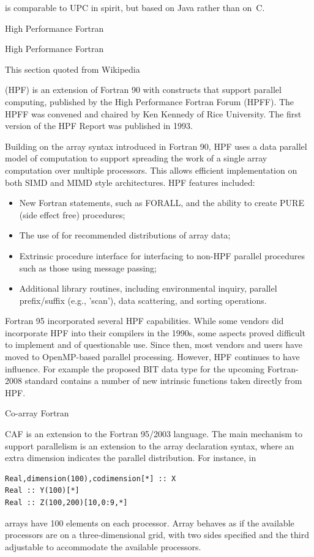 
 is comparable to \ac{UPC} in spirit, but based on Java rather
than on~C.

 {High Performance Fortran}
\label{sec:HPF}

High Performance Fortran
\begin{footnoteenv}
  {This section quoted from Wikipedia}
\end{footnoteenv}
(HPF) is an extension of Fortran 90 with constructs that support
parallel computing, published by the High Performance Fortran Forum
(HPFF). The HPFF was convened and chaired by Ken Kennedy of Rice
University. The first version of the HPF Report was published in 1993.

Building on the array syntax introduced in Fortran 90, HPF uses a data
parallel model of computation to support spreading the work of a
single array computation over multiple processors. This allows
efficient implementation on both SIMD and MIMD style
architectures. HPF features included:
\begin{itemize}
\item New Fortran statements, such as FORALL, and the ability to
  create PURE (side effect free) procedures;
\item The use of  for recommended
  distributions of array data;
\item Extrinsic procedure interface for interfacing to non-HPF
  parallel procedures such as those using message passing;
\item Additional library routines, including environmental inquiry,
  parallel prefix/suffix (e.g., 'scan'), data scattering, and sorting
  operations.
\end{itemize}
Fortran 95 incorporated several HPF capabilities.  While some vendors
did incorporate HPF into their compilers in the 1990s, some aspects
proved difficult to implement and of questionable use. Since then,
most vendors and users have moved to OpenMP-based parallel
processing. However, HPF continues to have
influence. For example the proposed BIT data type for the upcoming
Fortran-2008 standard contains a number of new intrinsic functions
taken directly from HPF.


 {Co-array Fortran}

\acf{CAF} is an extension to the Fortran 95/2003 language.
The main mechanism to support parallelism is an extension to the array
declaration syntax, where an extra dimension indicates the parallel
distribution. For instance, in
\begin{verbatim}
Real,dimension(100),codimension[*] :: X
Real :: Y(100)[*]
Real :: Z(100,200)[10,0:9,*]
\end{verbatim}
arrays  have 100 elements on each processor.
Array  behaves as if the available processors
are on a three-dimensional grid, with two sides specified 
and the third adjustable to accommodate the available processors.

